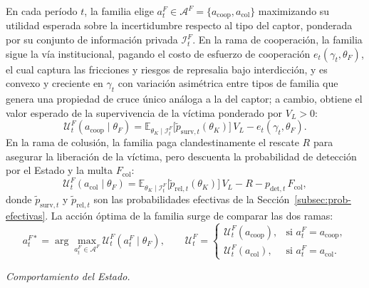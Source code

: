 \documentclass[review,authoryear,12pt]{elsarticle}
\theoremstyle{plain}
\theoremstyle{definition}
\newcommand{\E}{\mathbb{E}}
\newcommand{\1}{\mathbf{1}}
\begin{document}
\noindent En cada período $t$, la familia elige $a_t^F\in\mathcal{A}^F=\{a_{\mathrm{coop}},a_{\mathrm{col}}\}$ maximizando su utilidad esperada sobre la incertidumbre respecto al tipo del captor, ponderada por su conjunto de información privada $\mathcal{I}_t^F$. En la rama de cooperación, la familia sigue la vía institucional, pagando el costo de esfuerzo de cooperación $e_t(\gamma_t,\theta_F)$, el cual captura las fricciones y riesgos de represalia bajo interdicción, y es convexo y creciente en $\gamma_t$ con variación asimétrica entre tipos de familia que genera una propiedad de cruce único análoga a la del captor; a cambio, obtiene el valor esperado de la supervivencia de la víctima ponderado por $V_L>0$:
\begin{equation}
\mathcal{U}^F_t(a_{\mathrm{coop}}\mid\theta_F)=\E_{\theta_K\mid\mathcal{I}_t^F}\!\bigl[\tilde{p}_{\mathrm{surv},t}(\theta_K)\bigr]\,V_L-e_t(\gamma_t,\theta_F).
\label{eq:f-coop}
\end{equation}
En la rama de colusión, la familia paga clandestinamente el rescate $R$ para asegurar la liberación de la víctima, pero descuenta la probabilidad de detección por el Estado y la multa $F_{\mathrm{col}}$:
\begin{equation}
\mathcal{U}^F_t(a_{\mathrm{col}}\mid\theta_F)=\E_{\theta_K\mid\mathcal{I}_t^F}\!\bigl[\tilde{p}_{\mathrm{rel},t}(\theta_K)\bigr]\,V_L-R-p_{\mathrm{det},t}\,F_{\mathrm{col}},
\label{eq:f-col}
\end{equation}
donde $\tilde{p}_{\mathrm{surv},t}$ y $\tilde{p}_{\mathrm{rel},t}$ son las probabilidades efectivas de la Sección~\ref{subsec:prob-efectivas}. La acción óptima de la familia surge de comparar las dos ramas:
\begin{equation}
a_t^{F\ast}=\arg\max_{a_t^F\in\mathcal{A}^F}\mathcal{U}^F_t(a_t^F\mid\theta_F),\qquad
\mathcal{U}^F_t=\begin{cases}\mathcal{U}^F_t(a_{\mathrm{coop}}), & \text{si }a_t^F=a_{\mathrm{coop}},\\\mathcal{U}^F_t(a_{\mathrm{col}}), & \text{si }a_t^F=a_{\mathrm{col}}.\end{cases}
\label{eq:f-argmax}
\end{equation}

\noindent\textit{Comportamiento del Estado.}
\end{document}
